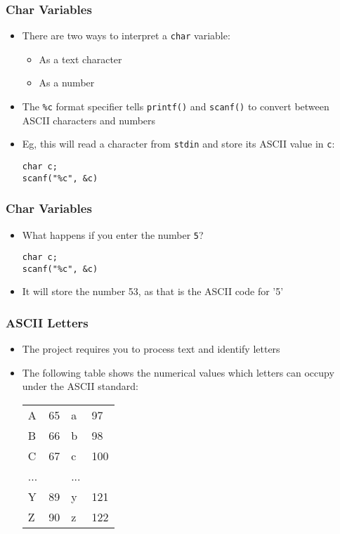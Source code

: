 \documentclass[14pt]{beamer}
\begin{document}
\begin{frame}[fragile]
\frametitle{Char Variables}
\begin{itemize}
\item There are two ways to interpret a \texttt{char} variable:
	\begin{itemize}
		\item As a text character
		\item As a number
	\end{itemize}
\item The \texttt{\%c} format specifier tells \texttt{printf()} and \texttt{scanf()} to convert between ASCII characters and numbers
\item Eg, this will read a character from \texttt{stdin} and store its ASCII value in \texttt{c}:
\begin{lstlisting}[style=CStyle]
char c;
scanf("%c", &c)
\end{lstlisting}
\end{itemize}
\end{frame}

\begin{frame}[fragile]
\frametitle{Char Variables}
\begin{itemize}
\item What happens if you enter the number \texttt{5}?
\begin{lstlisting}[style=CStyle]
char c;
scanf("%c", &c)
\end{lstlisting}
\pause
\item It will store the number 53, as that is the ASCII code for '5'
\end{itemize}
\end{frame}

\begin{frame}
\frametitle{ASCII Letters}
\begin{itemize}
\item The project requires you to process text and identify letters
\item The following table shows the numerical values which letters can occupy under the ASCII standard:

\begin{table}[H]
\begin{center}
\begin{tabular}{ll|ll}
A & 65 & a & 97\\
B & 66 & b & 98\\
C & 67 & c & 100\\
... & & ... & \\
Y & 89 & y & 121\\
Z & 90 & z & 122
\end{tabular}
\end{center}
\end{table}
\end{itemize}
\end{frame}
\end{document}
